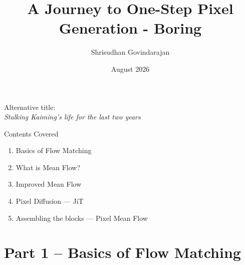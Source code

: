 \documentclass{beamer}
\title{A Journey to One-Step Pixel Generation - Boring}
\author{Shrisudhan Govindarajan}
\date{August 2026}
\begin{document}
\begin{frame}
\titlepage
\end{frame}

\begin{frame}
\centering
\Large Alternative title:\\[1em]
\textit{Stalking Kaiming's life for the last two years}
\end{frame}
\begin{frame}{Contents Covered}
\begin{enumerate}
\item Basics of Flow Matching
\item What is Mean Flow?
\item Improved Mean Flow
\item Pixel Diffusion --- JiT
\item Assembling the blocks --- Pixel Mean Flow
\end{enumerate}
\end{frame}

\section{Part 1 -- Basics of Flow Matching}
\end{document}
